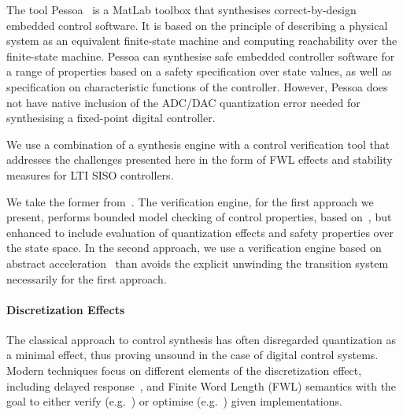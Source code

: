 \documentclass[runningheads,a4paper]{llncs}
\begin{document}
The tool Pessoa~\cite{mazo2010pessoa} is a MatLab toolbox that synthesises correct-by-design
embedded control software. It is based on the principle of describing a physical system
as an equivalent finite-state machine and computing reachability over the finite-state 
machine. Pessoa can synthesise safe embedded controller software for a range of properties based on a safety specification over state
values, as well as specification on characteristic functions of the controller. 
However, Pessoa does not have native inclusion of the ADC/DAC quantization error needed for
synthesising a fixed-point digital controller.

We use a combination of a synthesis engine with a control
verification tool that addresses the challenges presented here in the
form of FWL effects and stability measures for LTI SISO controllers.

We take the former from~\cite{DBLP:conf/lpar/DavidKL15}. The verification engine, for
the first approach we present, performs bounded model checking of control properties,
based on~\cite{Monteiro16}, but 
enhanced to include evaluation of quantization effects and safety properties
over the state space. In the second approach, we use a verification engine
based on abstract acceleration~\cite{cattaruzza2015unbounded} than avoids the explicit 
unwinding the transition system necessarily for the first approach.





\paragraph{Discretization Effects}

The classical approach to control synthesis has often disregarded
quantization as a minimal effect, thus proving unsound in the case of digital control systems.
Modern techniques focus on different elements of the discretization effect, including delayed
response~\cite{Duggirala2015}, and Finite Word Length (FWL) semantics with
the goal to either verify (e.g.~\cite{daes20161}) or optimise
(e.g.~\cite{oudjida2014design}) given implementations.
\end{document}
